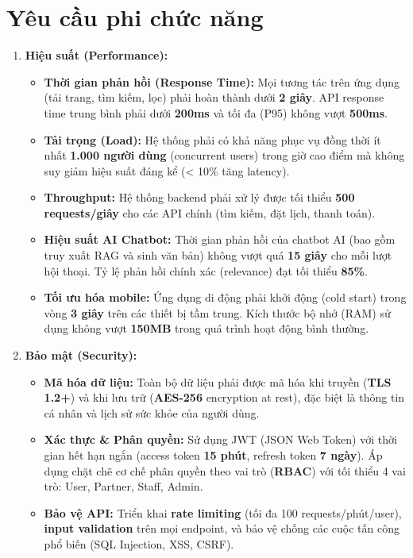 \section{Yêu cầu phi chức năng}
\begin{enumerate}
    \item \textbf{Hiệu suất (Performance):}
    \begin{itemize}
        \item \textbf{Thời gian phản hồi (Response Time):} Mọi tương tác trên ứng dụng (tải trang, tìm kiếm, lọc) phải hoàn thành dưới \textbf{2 giây}. API response time trung bình phải dưới \textbf{200ms} và tối đa (P95) không vượt \textbf{500ms}.
        \item \textbf{Tải trọng (Load):} Hệ thống phải có khả năng phục vụ đồng thời ít nhất \textbf{1.000 người dùng} (concurrent users) trong giờ cao điểm mà không suy giảm hiệu suất đáng kể (< 10\% tăng latency).
        \item \textbf{Throughput:} Hệ thống backend phải xử lý được tối thiểu \textbf{500 requests/giây} cho các API chính (tìm kiếm, đặt lịch, thanh toán).
        \item \textbf{Hiệu suất AI Chatbot:} Thời gian phản hồi của chatbot AI (bao gồm truy xuất RAG và sinh văn bản) không vượt quá \textbf{15 giây} cho mỗi lượt hội thoại. Tỷ lệ phản hồi chính xác (relevance) đạt tối thiểu \textbf{85\%}.
        \item \textbf{Tối ưu hóa mobile:} Ứng dụng di động phải khởi động (cold start) trong vòng \textbf{3 giây} trên các thiết bị tầm trung. Kích thước bộ nhớ (RAM) sử dụng không vượt \textbf{150MB} trong quá trình hoạt động bình thường.
    \end{itemize}
    \item \textbf{Bảo mật (Security):}
    \begin{itemize}
        \item \textbf{Mã hóa dữ liệu:} Toàn bộ dữ liệu phải được mã hóa khi truyền (\textbf{TLS 1.2+}) và khi lưu trữ (\textbf{AES-256} encryption at rest), đặc biệt là thông tin cá nhân và lịch sử sức khỏe của người dùng.
        \item \textbf{Xác thực \& Phân quyền:} Sử dụng JWT (JSON Web Token) với thời gian hết hạn ngắn (access token \textbf{15 phút}, refresh token \textbf{7 ngày}). Áp dụng chặt chẽ cơ chế phân quyền theo vai trò (\textbf{RBAC}) với tối thiểu 4 vai trò: User, Partner, Staff, Admin.
        \item \textbf{Bảo vệ API:} Triển khai \textbf{rate limiting} (tối đa 100 requests/phút/user), \textbf{input validation} trên mọi endpoint, và bảo vệ chống các cuộc tấn công phổ biến (SQL Injection, XSS, CSRF).

\end{itemize}
\end{enumerate}
